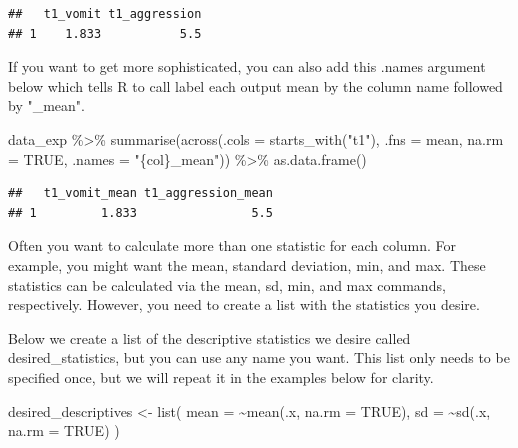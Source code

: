 \documentclass[
]{krantz}
\makeatletter
\newenvironment{Shaded}{\begin{snugshade}}{\end{snugshade}}
\newcommand{\AttributeTok}[1]{\textcolor[rgb]{0.61,0.61,0.61}{#1}}
\newcommand{\ConstantTok}[1]{\textcolor[rgb]{0,0,0}{#1}}
\newcommand{\FunctionTok}[1]{\textcolor[rgb]{0,0,0}{#1}}
\newcommand{\NormalTok}[1]{#1}
\newcommand{\OtherTok}[1]{\textcolor[rgb]{0.37,0.37,0.37}{#1}}
\newcommand{\SpecialCharTok}[1]{\textcolor[rgb]{0,0,0}{#1}}
\newcommand{\StringTok}[1]{\textcolor[rgb]{0.5,0.5,0.5}{#1}}
\newenvironment{kframe}{%
\medskip{}
\setlength{\fboxsep}{.8em}
 \def\at@end@of@kframe{}%
 \ifinner\ifhmode%
  \def\at@end@of@kframe{\end{minipage}}%
  \begin{minipage}{\columnwidth}%
 \fi\fi%
 \def\FrameCommand##1{\hskip\@totalleftmargin \hskip-\fboxsep
 \colorbox{shadecolor}{##1}\hskip-\fboxsep
     \hskip-\linewidth \hskip-\@totalleftmargin \hskip\columnwidth}%
 \MakeFramed {\advance\hsize-\width
   \@totalleftmargin\z@ \linewidth\hsize
   \@setminipage}}%
 {\par\unskip\endMakeFramed%
 \at@end@of@kframe}
\renewenvironment{Shaded}{\begin{kframe}}{\end{kframe}}
\makeatother
\begin{document}
\begin{verbatim}
##   t1_vomit t1_aggression
## 1    1.833           5.5
\end{verbatim}

If you want to get more sophisticated, you can also add this .names argument below which tells R to call label each output mean by the column name followed by "\_mean".

\begin{Shaded}
\begin{Highlighting}[]
\NormalTok{data\_exp }\SpecialCharTok{\%\textgreater{}\%}
  \FunctionTok{summarise}\NormalTok{(}\FunctionTok{across}\NormalTok{(}\AttributeTok{.cols =} \FunctionTok{starts\_with}\NormalTok{(}\StringTok{"t1"}\NormalTok{), }
                   \AttributeTok{.fns =}\NormalTok{ mean,}
                   \AttributeTok{na.rm =} \ConstantTok{TRUE}\NormalTok{,}
                   \AttributeTok{.names =} \StringTok{"\{col\}\_mean"}\NormalTok{))  }\SpecialCharTok{\%\textgreater{}\%}
  \FunctionTok{as.data.frame}\NormalTok{()}
\end{Highlighting}
\end{Shaded}

\begin{verbatim}
##   t1_vomit_mean t1_aggression_mean
## 1         1.833                5.5
\end{verbatim}

Often you want to calculate more than one statistic for each column. For example, you might want the mean, standard deviation, min, and max. These statistics can be calculated via the mean, sd, min, and max commands, respectively. However, you need to create a list with the statistics you desire.

Below we create a list of the descriptive statistics we desire called desired\_statistics, but you can use any name you want. This list only needs to be specified once, but we will repeat it in the examples below for clarity.

\begin{Shaded}
\begin{Highlighting}[]
\NormalTok{desired\_descriptives }\OtherTok{\textless{}{-}} \FunctionTok{list}\NormalTok{(}
  \AttributeTok{mean =} \SpecialCharTok{\textasciitilde{}}\FunctionTok{mean}\NormalTok{(.x, }\AttributeTok{na.rm =} \ConstantTok{TRUE}\NormalTok{),}
  \AttributeTok{sd =} \SpecialCharTok{\textasciitilde{}}\FunctionTok{sd}\NormalTok{(.x, }\AttributeTok{na.rm =} \ConstantTok{TRUE}\NormalTok{)}
\NormalTok{)}
\end{Highlighting}
\end{Shaded}
\end{document}
